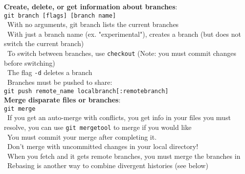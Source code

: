 \documentclass[12pt]{article}
\begin{document}
{{\bf Create, delete, or get information about branches}:\\
\texttt{git branch [flags] [branch name]}\\
\textbullet\, With no arguments, git branch lists the current branches\\
\textbullet\, With just a branch name (ex. "experimental"), creates a branch (but does not switch the current branch)\\
\textbullet\, To switch between branches, use \texttt{checkout} (Note: you must commit changes before switching)\\
\textbullet\, The flag \texttt{-d} deletes a branch\\
\textbullet\, Branches must be pushed to share:\\
 \hspace*{6mm}\texttt{git push remote{\_}name localbranch[:remotebranch]}\\

{\bf Merge disparate files or branches}:\\
\texttt{git merge}\\    
\textbullet\, If you get an auto-merge with conflicts, you get info in your files you must resolve, you can use \texttt{git mergetool} to merge if you would like\\
\textbullet\, You must commit your merge after completing it.\\
\textbullet\, Don't merge with uncommitted changes in your local directory!\\
\textbullet\, When you fetch and it gets remote branches, you must merge the branches in\\
\textbullet\, Rebasing is another way to combine divergent histories (see below)\\

}
\end{document}
